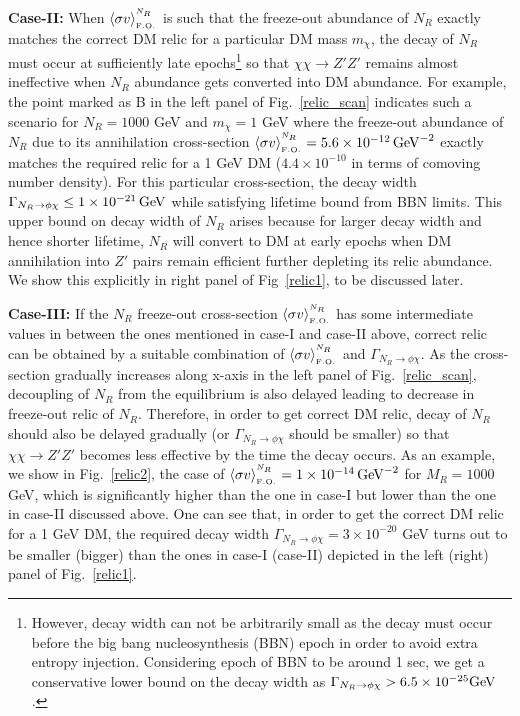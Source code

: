 \documentclass[prd,nofootinbib,preprint,superscriptaddress]{revtex4}
\begin{document}
{\bf Case-II:}  When $\langle\sigma v \rangle^{^{N_R}}_{_{ \rm F.O.}}$ is such that the freeze-out abundance of $N_R$ exactly matches the correct DM relic for a particular DM mass $m_\chi$, the decay of $N_R$ must occur at sufficiently late epochs\footnote{However, decay width can not be arbitrarily small as the decay must occur before the big bang nucleosynthesis (BBN) epoch in order to avoid extra entropy injection. Considering epoch of BBN to be around 1 sec, we get a conservative lower bound on the decay width as $\Gamma_{N_R \to \phi \chi}> 6.5 \times 10^{-25}{\rm GeV}$.} so that $\chi \chi \to Z'Z'$ remains almost ineffective when $N_R$ abundance gets converted into DM abundance. For example, the point marked as B in the left panel of Fig.~\ref{relic_scan} indicates such a scenario for $N_R=1000$ GeV and $m_\chi = 1$ GeV where the freeze-out abundance of $N_R$ due to its annihilation cross-section $\langle\sigma v \rangle^{^{N_R}}_{_{ \rm F.O.}}= 5.6 \times 10^{-12}\,{\rm GeV}^{-2}$ exactly matches the required relic for a 1 GeV DM ($4.4 \times 10^{-10}$ in terms of comoving number density). For this particular cross-section, the decay width $ \Gamma_{N_R \to \phi \chi} \leq 1\times 10^{-21}\,{\rm GeV}$ while satisfying lifetime bound from BBN limits. This upper bound on decay width of $N_R$ arises because for larger decay width and hence shorter lifetime, $N_R$ will convert to DM at early epochs when DM annihilation into $Z'$ pairs remain efficient further depleting its relic abundance. We show this explicitly in right panel of Fig~\ref{relic1}, to be discussed later.

{\bf Case-III:} If the $N_R$ freeze-out cross-section  $\langle\sigma v \rangle^{^{N_R}}_{_{ \rm F.O.}}$ has some intermediate values in between the ones mentioned in case-I and case-II above, correct relic can be obtained by a suitable combination of $\langle\sigma v \rangle^{^{N_R}}_{_{ \rm F.O.}}$ and $\Gamma_{N_R \to \phi \chi}$. As the cross-section gradually increases along x-axis in the left panel of Fig.~\ref{relic_scan}, decoupling of $N_R$ from the equilibrium is also delayed leading to decrease in freeze-out relic of $N_R$. Therefore, in order to get correct DM relic, decay of $N_R$ should also be delayed gradually (or $\Gamma_{N_R \to \phi \chi}$ should be smaller) so that $\chi \chi \to Z'Z'$ becomes less effective by the time the decay occurs. As an example, we show in Fig.~\ref{relic2}, the case of $\langle\sigma v \rangle^{^{N_R}}_{_{ \rm F.O.}}= 1 \times 10^{-14}\, {\rm GeV}^{-2}$ for $M_R = 1000$ GeV, which  is significantly higher than the one in case-I but lower than the one in case-II discussed above. One can see that, in order to get the correct DM relic for a 1 GeV DM, the required decay width $\Gamma_{N_R \to \phi \chi} = 3\times 10^{-20}$ GeV turns out to be smaller (bigger) than the ones in case-I (case-II) depicted in the left (right) panel of Fig.~\ref{relic1}. 
\end{document}
